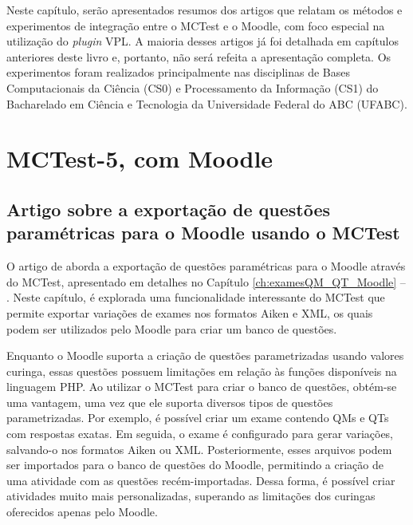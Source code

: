 \label{ch:experimentos_VPL}

Neste capítulo, serão apresentados resumos dos artigos que relatam os métodos e experimentos de integração entre o MCTest e o Moodle, com foco especial na utilização do \textit{plugin} VPL. A maioria desses artigos já foi detalhada em capítulos anteriores deste livro e, portanto, não será refeita a apresentação completa. Os experimentos foram realizados principalmente nas disciplinas de Bases Computacionais da Ciência (CS0) e Processamento da Informação (CS1) do Bacharelado em Ciência e Tecnologia da Universidade Federal do ABC (UFABC).

\section{MCTest-5, com Moodle}

\subsection*{Artigo sobre a exportação de questões paramétricas para o Moodle usando o MCTest}

O artigo de  aborda a exportação de questões paramétricas para o Moodle através do MCTest, apresentado em detalhes no Capítulo \ref{ch:examesQM_QT_Moodle} -- . Neste capítulo, é explorada uma funcionalidade interessante do MCTest que permite exportar variações de exames nos formatos Aiken e XML, os quais podem ser utilizados pelo Moodle para criar um banco de questões.

Enquanto o Moodle suporta a criação de questões parametrizadas usando valores curinga, essas questões possuem limitações em relação às funções disponíveis na linguagem PHP. Ao utilizar o MCTest para criar o banco de questões, obtém-se uma vantagem, uma vez que ele suporta diversos tipos de questões parametrizadas. Por exemplo, é possível criar um exame contendo QMs e QTs com respostas exatas. Em seguida, o exame é configurado para gerar variações, salvando-o nos formatos Aiken ou XML. Posteriormente, esses arquivos podem ser importados para o banco de questões do Moodle, permitindo a criação de uma atividade com as questões recém-importadas. Dessa forma, é possível criar atividades muito mais personalizadas, superando as limitações dos curingas oferecidos apenas pelo Moodle.

